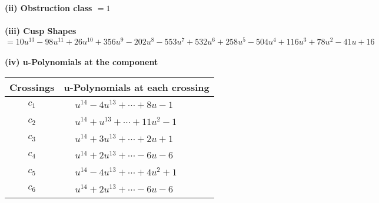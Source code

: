 \documentclass[1p]{elsarticle_modified}
\theoremstyle{definition}
\begin{document}
\flushleft \textbf{(ii) Obstruction class $= 1$}\\~\\
\flushleft \textbf{(iii) Cusp Shapes $= 10 u^{13}-98 u^{11}+26 u^{10}+356 u^9-202 u^8-553 u^7+532 u^6+258 u^5-504 u^4+116 u^3+78 u^2-41 u+16$}\\~\\
\newpage\renewcommand{\arraystretch}{1}
\flushleft \textbf{(iv) u-Polynomials at the component}\newline \\
\begin{tabular}{m{50pt}|m{274pt}}
Crossings & \hspace{64pt}u-Polynomials at each crossing \\
\hline $$\begin{aligned}c_{1}\end{aligned}$$&$\begin{aligned}
&u^{14}-4 u^{13}+\cdots+8 u-1
\end{aligned}$\\
\hline $$\begin{aligned}c_{2}\end{aligned}$$&$\begin{aligned}
&u^{14}+u^{13}+\cdots+11 u^2-1
\end{aligned}$\\
\hline $$\begin{aligned}c_{3}\end{aligned}$$&$\begin{aligned}
&u^{14}+3 u^{13}+\cdots+2 u+1
\end{aligned}$\\
\hline $$\begin{aligned}c_{4}\end{aligned}$$&$\begin{aligned}
&u^{14}+2 u^{13}+\cdots-6 u-6
\end{aligned}$\\
\hline $$\begin{aligned}c_{5}\end{aligned}$$&$\begin{aligned}
&u^{14}-4 u^{13}+\cdots+4 u^2+1
\end{aligned}$\\
\hline $$\begin{aligned}c_{6}\end{aligned}$$&$\begin{aligned}
&u^{14}+2 u^{13}+\cdots-6 u-6
\end{aligned}$\\

\end{tabular}
\end{document}
